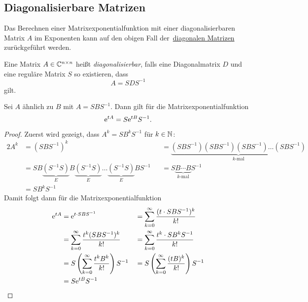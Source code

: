 \subsection{Diagonalisierbare Matrizen}\label{subsec:diagonalisierbare-matrizen}
Das Berechnen einer Matrixexponentialfunktion mit einer diagonalisierbaren Matrix $A$ im Exponenten
kann auf den obigen Fall der~\hyperref[subsec:diagonale-matrizen]{diagonalen Matrizen} zurückgeführt werden.

\begin{definition}[Wiederholung]
    Eine Matrix $A \in \mathbb{C}^{n \times n}$ heißt \emph{diagonalisierbar}, falls eine Diagonalmatrix $D$ und eine reguläre Matrix $S$ so existieren, dass
    \begin{equation*}
        A = S D S^{-1}
    \end{equation*}
    gilt.
\end{definition}

\begin{lemma}\label{thm:matrixexponential-diagonalisierbar}
    Sei $A$ ähnlich zu $B$ mit $A = S B S^{-1}$.
    Dann gilt für die Matrixexponentialfunktion
    \begin{equation*}
        \mathrm{e}^{t A} = S \mathrm{e}^{t B} S^{-1}.
    \end{equation*}
\end{lemma}

\begin{proof}
    Zuerst wird gezeigt, dass $A^k = S B^k S^{-1}$ für $k \in \mathbb{N}$:
    \begin{alignat*}{2}
        A^k &= (S B S^{-1})^k &&= \underbrace{(S B S^{-1}) (S B S^{-1}) (S B S^{-1}) \dots (S B S^{-1})}_{k \text{-mal}}\\
            &= SB\underbrace{(S^{-1} S)}_{E} B \underbrace{(S^{-1} S)}_{E} \dots \underbrace{(S^{-1} S)}_{E} B S^{-1}
                &&= S \underbrace{B \cdots B}_{k \text{-mal}} S^{-1}\\
            &= S B^k S^{-1}
    \end{alignat*}
    Damit folgt dann für die Matrixexponentialfunktion
    \begin{alignat*}{2}
        \mathrm{e}^{t A} &= \mathrm{e}^{t \cdot S B S^{-1}} &&= \sum^\infty_{k=0} \frac{(t \cdot S B S^{-1})^k}{k!}\\
                 &= \sum^\infty_{k=0} \frac{t^k (S B S^{-1})^k}{k!} &&= \sum^\infty_{k=0} \frac{t^k \cdot S B^k S^{-1}}{k!}\\
                 &= S \left( \sum^\infty_{k=0} \frac{t^k B^k}{k!} \right) S^{-1} &&= S \left( \sum^\infty_{k=0} \frac{(t B)^k}{k!} \right) S^{-1}\\
                 &= S \mathrm{e}^{t B} S^{-1}
    \end{alignat*}
\end{proof}

